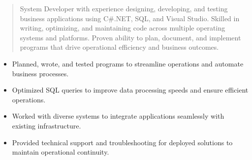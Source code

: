 



\makecvheader

\begin{quote}
  \noindent
  System Developer with experience designing, developing, and testing business applications using C#.NET, SQL, and Visual Studio. Skilled in writing, optimizing, and maintaining code across multiple operating systems and platforms. Proven ability to plan, document, and implement programs that drive operational efficiency and business outcomes.
\end{quote}

\par\smallskip
\noindent
\begin{minipage}{20cm}
  \begin{minipage}{9.75cm}
    \begin{itemize}
      \item Planned, wrote, and tested programs to streamline operations and automate business processes.
      \item Optimized SQL queries to improve data processing speeds and ensure efficient operations.
    \end{itemize}
  \end{minipage}
  \hfill
  \begin{minipage}{9.75cm}
    \begin{itemize}
      \item Worked with diverse systems to integrate applications seamlessly with existing infrastructure.
      \item Provided technical support and troubleshooting for deployed solutions to maintain operational continuity.
    \end{itemize}
  \end{minipage}
\end{minipage}
\par\smallskip
\divider

